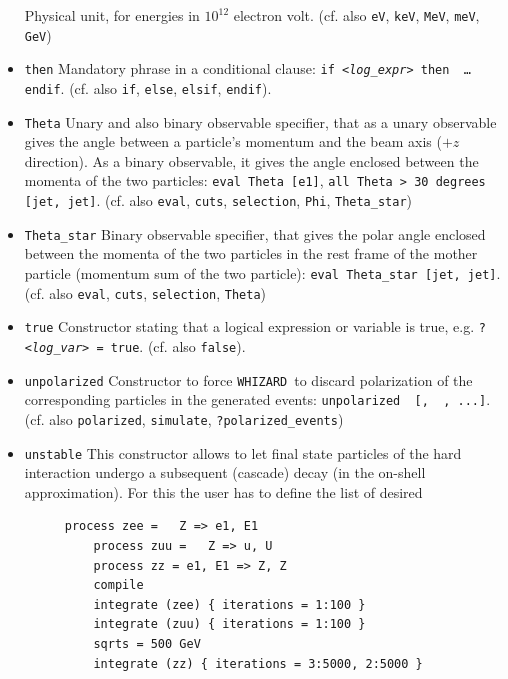 \documentclass[12pt]{book}
\newcommand{\ttt}[1]{\texttt{#1}}
\newcommand{\whizard}{\ttt{WHIZARD}}
\begin{document}
\begin{itemize}
Physical unit, for energies in $10^{12}$ electron volt. (cf. also
\ttt{eV}, \ttt{keV}, \ttt{MeV}, \ttt{meV}, \ttt{GeV})
\item
\ttt{then} \newline
Mandatory phrase in a conditional clause: \ttt{if {\em <log\_expr>} then
  {\em <expr 1>} \ldots endif}. (cf. also \ttt{if}, \ttt{else}, \ttt{elsif},
\ttt{endif}).
\item
\ttt{Theta} \newline
Unary and also binary observable specifier, that as a unary observable
gives the angle between a particle's momentum and the beam axis ($+z$
direction). As a binary observable, it gives the angle enclosed
between the momenta of the two particles: \ttt{eval Theta [e1]},
\ttt{all Theta > 30 degrees [jet, jet]}. (cf. also \ttt{eval},
\ttt{cuts}, \ttt{selection}, \ttt{Phi}, \ttt{Theta\_star})
\item
\ttt{Theta\_star} \newline
Binary observable specifier, that gives the polar angle enclosed
between the momenta of the two particles in the rest frame of the
mother particle (momentum sum of the two particle): \ttt{eval
Theta\_star [jet, jet]}. (cf. also \ttt{eval},
\ttt{cuts}, \ttt{selection}, \ttt{Theta})
\item
\ttt{true} \newline
Constructor stating that a logical expression or variable is true,
e.g. \ttt{?{\em <log\_var>} = true}. (cf. also \ttt{false}).
\item
\ttt{unpolarized} \newline
Constructor to force \whizard\ to discard polarization of the
corresponding particles in the generated events: \ttt{unpolarized {\em <prt1>}
  [, {\em <prt2>} , ...]}. (cf. also \ttt{polarized}, \ttt{simulate},
\ttt{?polarized\_events})
\item
\ttt{unstable} \newline
This constructor allows to let final state particles of the hard
interaction undergo a subsequent (cascade) decay (in the on-shell
approximation). For this the user has to define the list of desired
\begin{figure}
  \begin{Verbatim}[frame=single]
    process zee =   Z => e1, E1
    process zuu =   Z => u, U
    process zz = e1, E1 => Z, Z
    compile
    integrate (zee) { iterations = 1:100 }
    integrate (zuu) { iterations = 1:100 }
    sqrts = 500 GeV
    integrate (zz) { iterations = 3:5000, 2:5000 }

\end{Verbatim}
\end{figure}
\end{itemize}
\end{document}
